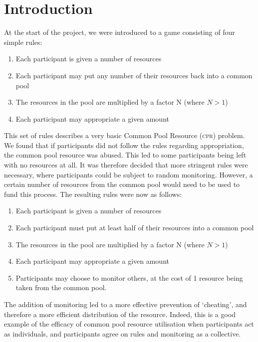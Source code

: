 \section{Introduction}

At the start of the project, we were introduced to a game consisting of four simple rules:

\begin{enumerate}
\item Each participant is given a number of resources
\item Each participant may put any number of their resources back into a common pool
\item	The resources in the pool are multiplied by a factor N (where $N > 1$)
\item	Each participant may appropriate a given amount
\end{enumerate}

This set of rules describes a very basic Common Pool Resource (\textsc{cpr}) problem. We found that if participants did not follow the rules regarding appropriation, the common pool resource was abused. This led to some participants being left with no resources at all. It was therefore decided that more stringent rules were necessary, where participants could be subject to random monitoring. However, a certain number of resources from the common pool would need to be used to fund this process. The resulting rules were now as follows:

\begin{enumerate}
	\item Each participant is given a number of resources
	\item Each participant must put at least half of their resources into a common pool
	\item The resources in the pool are multiplied by a factor N (where $N > 1$)
	\item Each participant may appropriate a given amount
	\item Participants may choose to monitor others, at the cost of 1 resource being taken from the common pool.
\end{enumerate}

The addition of monitoring led to a more effective prevention of `cheating', and therefore a more efficient distribution of the resource. Indeed, this is a good example of the efficacy of common pool resource utilisation when participants act as individuals, and participants agree on rules and monitoring as a collective.

